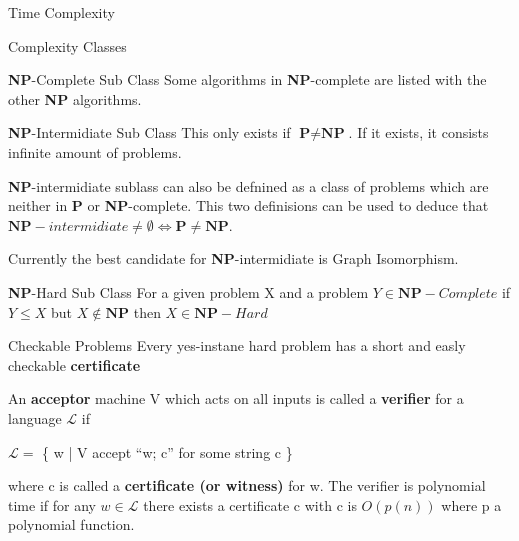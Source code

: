 \documentclass[12pt, letterpaper]{article}
\begin{document}
\begin{section}{Time Complexity}
\begin{subsection}{Complexity Classes}
\begin{subsubsection}{\textbf{NP}-Complete Sub Class}
      Some algorithms in \textbf{NP}-complete are listed with the other \textbf{NP} algorithms.
    \end{subsubsection}

    \begin{subsubsection}{\textbf{NP}-Intermidiate Sub Class}
      This only exists if \(\textbf{P} \neq \textbf{NP}\).
      If it exists, it consists infinite amount of problems.

      \textbf{NP}-intermidiate sublass can also be defnined as a class of
      problems which are neither in \textbf{P} or \textbf{NP}-complete.
      This two definisions can be used to deduce that
      \(\textbf{NP}-intermidiate \neq \emptyset \iff \textbf{P} \neq \textbf{NP}\).

      Currently the best candidate for \textbf{NP}-intermidiate is Graph Isomorphism.
    \end{subsubsection}

    \begin{subsubsection}{\textbf{NP}-Hard Sub Class}
      For a given problem X and a problem \(Y \in \textbf{NP}-Complete\) if
      \(Y \leq X\) but \(X \notin \textbf{NP}\) then \(X \in \textbf{NP}-Hard\)
    \end{subsubsection}

  \end{subsection}

  \begin{subsection}{Checkable Problems}
    Every yes-instane hard problem has a short and easly checkable \textbf{certificate}

    An \textbf{acceptor} machine V which acts on all inputs is called a \textbf{verifier}
    for a language \(\mathscr{L}\) if
    \begin{center}
      \(\mathscr{L} = \) \{{} w | V accept ``w; c'' for some string c \}{}
    \end{center}
    where c is called a \textbf{certificate (or witness)} for w. The verifier is
    polynomial time if for any \(w \in \mathscr{L}\) there exists a certificate
    c with c is \(O(p(n))\) where p a polynomial function.
  \end{subsection}

\end{section}
\end{document}
